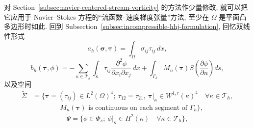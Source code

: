 对 Section~\ref{subsec:navier-centered-stream-vorticity} 的方法作少量修改,
就可以把它应用于 Navier--Stokes 方程的``流函数--速度梯度张量''方法,
至少在 $\Omega$ 是平面凸多边形时如此. 回到
Subsection~\ref{subsec:incompressible-hhj-formulation}, 回忆双线性形式
\[
a_h(\boldsymbol\sigma,\boldsymbol\tau)
=\int_\Omega\sigma_{ij}\tau_{ij}\,dx,
\]
\[
b_h(\boldsymbol\tau,\phi)
=-\sum_{\kappa\in\mathcal T_h}\int_\kappa
\tau_{ij}\frac{\partial^2\phi}{\partial x_i\partial x_j}\,dx
+\int_{\Gamma_h}M_n(\boldsymbol\tau)
S\left(\frac{\partial\phi}{\partial n}\right)ds,
\]
以及空间
\[
\begin{aligned}
\widetilde\Sigma
&=\{\boldsymbol\tau=(\tau_{ij})\in L^2(\Omega)^4;
\ \tau_{12}=\tau_{21},
\ \boldsymbol\tau|_\kappa\in W^{1,r}(\kappa)^4
\quad\forall\kappa\in\mathcal T_h,\\
&\hspace{4em}
M_n(\boldsymbol\tau)\text{ is continuous on each segment of }\Gamma_h\},
\end{aligned}
\]
\[
\widetilde\Psi
=\{\phi\in\Phi_s;
\ \phi|_\kappa\in H^2(\kappa)
\quad\forall\kappa\in\mathcal T_h\},
\]

